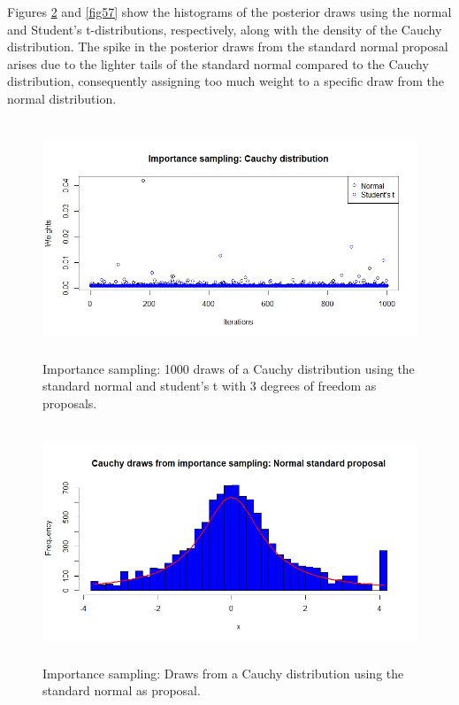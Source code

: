Figures \ref{fig56} and \ref{fig57} show the histograms of the posterior draws using the normal and Student's t-distributions, respectively, along with the density of the Cauchy distribution. The spike in the posterior draws from the standard normal proposal arises due to the lighter tails of the standard normal compared to the Cauchy distribution, consequently assigning too much weight to a specific draw from the normal distribution.

\begin{figure}[!h]
	\includegraphics[width=340pt, height=200pt]{Chapters/chapter5/figures/ISexampleCauchy.png}
	\caption[List of figure caption goes here]{Importance sampling: 1000 draws of a Cauchy distribution using the standard normal and student's t with 3 degrees of freedom as proposals.}\label{fig55}
\end{figure} 

\begin{figure}[!h]
	\includegraphics[width=340pt, height=200pt]{Chapters/chapter5/figures/IScauchyNormal.png}
	\caption[List of figure caption goes here]{Importance sampling: Draws from a Cauchy distribution using the standard normal as proposal.}\label{fig56}
\end{figure} 

